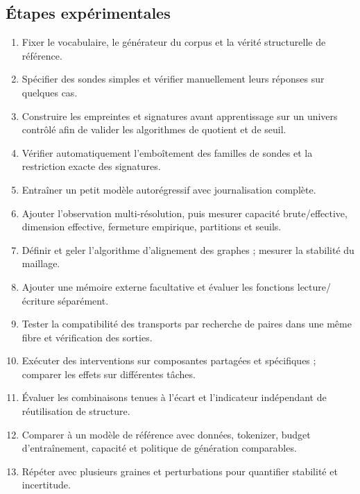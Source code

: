 \documentclass[11pt,a4paper]{article}
\theoremstyle{remark}
\begin{document}
\subsection{Étapes expérimentales}
\begin{enumerate}[label=\textbf{E\arabic*.}]
  \item Fixer le vocabulaire, le générateur du corpus et la vérité structurelle de référence.
  \item Spécifier des sondes simples et vérifier manuellement leurs réponses sur quelques cas.
  \item Construire les empreintes et signatures avant apprentissage sur un univers contrôlé afin de valider les algorithmes de quotient et de seuil.
  \item Vérifier automatiquement l'emboîtement des familles de sondes et la restriction exacte des signatures.
  \item Entraîner un petit modèle autorégressif avec journalisation complète.
  \item Ajouter l'observation multi-résolution, puis mesurer capacité brute/effective, dimension effective, fermeture empirique, partitions et seuils.
  \item Définir et geler l'algorithme d'alignement des graphes ; mesurer la stabilité du maillage.
  \item Ajouter une mémoire externe facultative et évaluer les fonctions lecture/écriture séparément.
  \item Tester la compatibilité des transports par recherche de paires dans une même fibre et vérification des sorties.
  \item Exécuter des interventions sur composantes partagées et spécifiques ; comparer les effets sur différentes tâches.
  \item Évaluer les combinaisons tenues à l'écart et l'indicateur indépendant de réutilisation de structure.
  \item Comparer à un modèle de référence avec données, tokenizer, budget d'entraînement, capacité et politique de génération comparables.
  \item Répéter avec plusieurs graines et perturbations pour quantifier stabilité et incertitude.
\end{enumerate}
\end{document}
